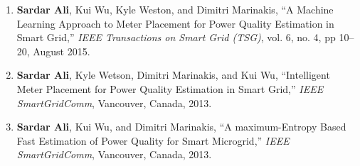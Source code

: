 \label{chap:publications}
\begin{enumerate}
\item \textbf{Sardar Ali}, Kui Wu, Kyle Weston, and Dimitri Marinakis, ``A Machine Learning Approach to Meter Placement for Power Quality Estimation in Smart Grid,'' \textit{IEEE Transactions on Smart Grid (TSG)}, vol. 6, no. 4, pp 10--20, August 2015.

\item \textbf{Sardar Ali}, Kyle Wetson, Dimitri Marinakis, and Kui Wu, ``Intelligent Meter Placement for Power Quality Estimation in Smart Grid,'' \textit{IEEE SmartGridComm}, Vancouver, Canada, 2013.

\item \textbf{Sardar Ali}, Kui Wu, and Dimitri Marinakis, ``A maximum-Entropy Based Fast Estimation of Power Quality for Smart Microgrid,'' \textit{IEEE SmartGridComm}, Vancouver, Canada, 2013.
\end{enumerate}